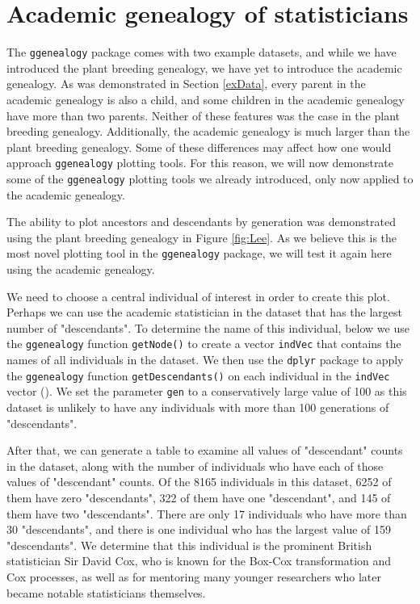 \documentclass[11pt,a4paper,oldfontcommands,openany]{memoir}
\numberwithin{equation}{section} %
\newcommand{\code}[1]{{\texttt{#1}}}
\newcommand{\pkg}[1]{{\texttt{#1}}}
\begin{document}
\section{Academic genealogy of statisticians}

The \pkg{ggenealogy} package comes with two example datasets, and while we have introduced the plant breeding genealogy, we have yet to introduce the academic genealogy. As was demonstrated in Section \ref{exData}, every parent in the academic genealogy is also a child, and some children in the academic genealogy have more than two parents. Neither of these features was the case in the plant breeding genealogy. Additionally, the academic genealogy is much larger than the plant breeding genealogy. Some of these differences may affect how one would approach \pkg{ggenealogy} plotting tools. For this reason, we will now demonstrate some of the \pkg{ggenealogy} plotting tools we already introduced, only now applied to the academic genealogy. 

The ability to plot ancestors and descendants by generation was demonstrated using the plant breeding genealogy in Figure \ref{fig:Lee}. As we believe this is the most novel plotting tool in the \pkg{ggenealogy} package, we will test it again here using the academic genealogy.

We need to choose a central individual of interest in order to create this plot. Perhaps we can use the academic statistician in the dataset that has the largest number of "descendants". To determine the name of this individual, below we use the \pkg{ggenealogy} function \code{getNode()} to create a vector \code{indVec} that contains the names of all individuals in the dataset. We then use the \pkg{dplyr} package to apply the \pkg{ggenealogy} function \code{getDescendants()} on each individual in the \code{indVec} vector (\citealt{dplyr}). We set the parameter \code{gen} to a conservatively large value of 100 as this dataset is unlikely to have any individuals with more than 100 generations of "descendants".

After that, we can generate a table to examine all values of "descendant" counts in the dataset, along with the number of individuals who have each of those values of "descendant" counts. Of the 8165 individuals in this dataset, 6252 of them have zero "descendants", 322 of them have one "descendant", and 145 of them have two "descendants". There are only 17 individuals who have more than 30 "descendants", and there is one individual who has the largest value of 159 "descendants". We determine that this individual is the prominent British statistician Sir David Cox, who is known for the Box-Cox transformation and Cox processes, as well as for mentoring many younger researchers who later became notable statisticians themselves.
\end{document}
